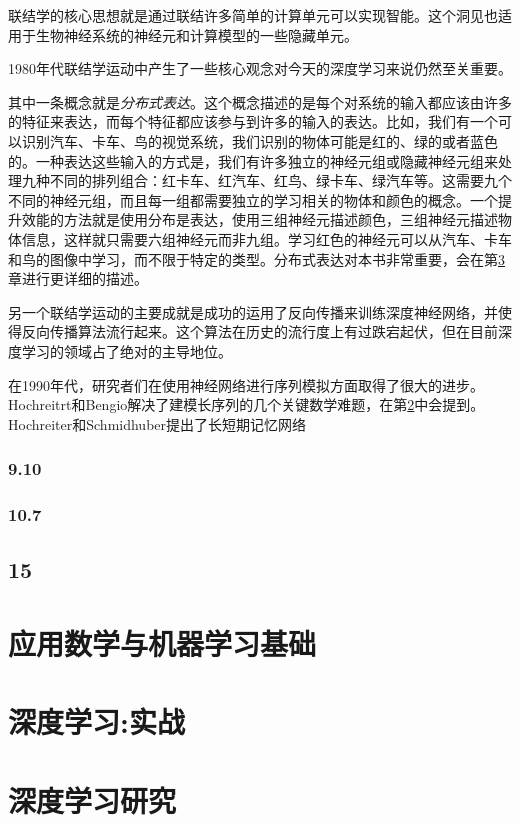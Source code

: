 \documentclass[a4paper,11pt]{book}
\begin{document}
联结学的核心思想就是通过联结许多简单的计算单元可以实现智能。这个洞见也适用于生物神经系统的神经元和计算模型的一些隐藏单元。


1980年代联结学运动中产生了一些核心观念对今天的深度学习来说仍然至关重要。


其中一条概念就是\emph{分布式表达}。这个概念描述的是每个对系统的输入都应该由许多的特征来表达，而每个特征都应该参与到许多的输入的表达。比如，我们有一个可以识别汽车、卡车、鸟的视觉系统，我们识别的物体可能是红的、绿的或者蓝色的。一种表达这些输入的方式是，我们有许多独立的神经元组或隐藏神经元组来处理九种不同的排列组合：红卡车、红汽车、红鸟、绿卡车、绿汽车等。这需要九个不同的神经元组，而且每一组都需要独立的学习相关的物体和颜色的概念。一个提升效能的方法就是使用分布是表达，使用三组神经元描述颜色，三组神经元描述物体信息，这样就只需要六组神经元而非九组。学习红色的神经元可以从汽车、卡车和鸟的图像中学习，而不限于特定的类型。分布式表达对本书非常重要，会在第\ref{chap:15}章进行更详细的描述。


另一个联结学运动的主要成就是成功的运用了反向传播来训练深度神经网络，并使得反向传播算法流行起来。这个算法在历史的流行度上有过跌宕起伏，但在目前深度学习的领域占了绝对的主导地位。

在1990年代，研究者们在使用神经网络进行序列模拟方面取得了很大的进步。Hochreitrt和Bengio解决了建模长序列的几个关键数学难题，在第\ref{sec:10.7}中会提到。Hochreiter和Schmidhuber提出了长短期记忆网络

\section{9.10}
\label{sec:9.10}

\section{10.7}
\label{sec:10.7}

\chapter{15}
\label{chap:15}








\part{应用数学与机器学习基础}
\label{part:1}

\part{深度学习:实战}
\label{part:2}

\part{深度学习研究}
\label{part:3}
\end{document}
